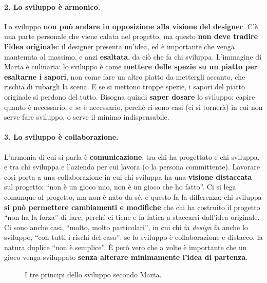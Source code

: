 \paragraph{2. Lo sviluppo è armonico.} Lo sviluppo \textbf{non può andare in opposizione
alla visione del designer}. C'è una parte personale che viene calata nel progetto, ma
questo \textbf{non deve tradire l'idea originale}: il designer presenta un'idea, ed è
importante che venga mantenuta al massimo, e anzi \textbf{esaltata}, da ciò che fa chi
sviluppa. L'immagine di Marta è culinaria: lo sviluppo è come \textbf{mettere delle spezie
su un piatto per esaltarne i sapori}, non come fare un altro piatto da mettergli accanto,
che rischia di rubargli la scena. E se si mettono troppe spezie, i sapori del piatto
originale si perdono del tutto. Bisogna quindi \textbf{saper dosare} lo sviluppo: capire
quanto è necessario, e \emph{se} è necessario, perché ci sono casi (ci si tornerà) in cui
non serve fare sviluppo, o serve il minimo indispensabile.

\paragraph{3. Lo sviluppo è collaborazione.} L'armonia di cui si parla è
\textbf{comunicazione}: tra chi ha progettato e chi sviluppa, e tra chi sviluppa e
l'azienda per cui lavora (o la persona committente). Lavorare così porta a una
collaborazione in cui chi sviluppa ha una \textbf{visione distaccata} sul progetto: ``non
è un gioco mio, non è un gioco che ho fatto''. Ci si lega comunque al progetto, ma non è
nato da sé, e questo fa la differenza: chi sviluppa \textbf{si può permettere cambiamenti
e modifiche} che chi ha costruito il progetto ``non ha la forza'' di fare, perché ci
tiene e fa fatica a staccarsi dall'idea originale. Ci sono anche casi, ``molto, molto
particolari'', in cui chi fa \emph{design} fa anche lo sviluppo, ``con tutti i rischi del
caso'': se lo sviluppo è collaborazione e distacco, la natura duplice ``non è semplice''.
È però vero che a volte è importante che un gioco venga sviluppato \textbf{senza alterare
minimamente l'idea di partenza}.

\begin{figure}[htbp]
\centering
{}
\caption{I tre principi dello sviluppo secondo Marta.}
\label{a13:fig:principi}
\end{figure}

